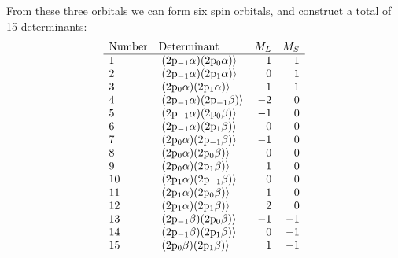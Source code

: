 \documentclass[../Main/chem532-notes.tex]{subfiles}
\begin{document}
\begin{example}
From these three orbitals we can form six spin orbitals, and construct a total of 15 determinants:
\begin{equation}
   \begin{array}{llrr}
    \text{Number} & \text{Determinant} & M_L & M_S \\
    \hline
   1 & \ket{(2\mathrm{p}_{-1} \alpha) (2\mathrm{p}_{0} \alpha)} & -1 & 1 \\
   2 & \ket{(2\mathrm{p}_{-1} \alpha) (2\mathrm{p}_{1} \alpha)} & 0 & 1 \\
   3 & \ket{(2\mathrm{p}_{0} \alpha) (2\mathrm{p}_{1} \alpha)} & 1 & 1 \\
   4 & \ket{(2\mathrm{p}_{-1} \alpha) (2\mathrm{p}_{-1} \beta)} & -2 & 0 \\
   5 & \ket{(2\mathrm{p}_{-1} \alpha) (2\mathrm{p}_{0} \beta)} & -1 & 0 \\
   6 & \ket{(2\mathrm{p}_{-1} \alpha) (2\mathrm{p}_{1} \beta)} & 0 & 0 \\
   7 & \ket{(2\mathrm{p}_{0} \alpha) (2\mathrm{p}_{-1} \beta)} & -1 & 0 \\
   8 & \ket{(2\mathrm{p}_{0} \alpha) (2\mathrm{p}_{0} \beta)} & 0 & 0 \\  
   9 & \ket{(2\mathrm{p}_{0} \alpha) (2\mathrm{p}_{1} \beta)} & 1 & 0 \\
   10 & \ket{(2\mathrm{p}_{1} \alpha) (2\mathrm{p}_{-1} \beta)} & 0 & 0 \\
   11 & \ket{(2\mathrm{p}_{1} \alpha) (2\mathrm{p}_{0} \beta)} & 1 & 0 \\
   12 & \ket{(2\mathrm{p}_{1} \alpha) (2\mathrm{p}_{1} \beta)} & 2 & 0 \\
   13 & \ket{(2\mathrm{p}_{-1} \beta) (2\mathrm{p}_{0} \beta)} & -1 & -1 \\
   14 & \ket{(2\mathrm{p}_{-1} \beta) (2\mathrm{p}_{1} \beta)} & 0 & -1 \\
   15 & \ket{(2\mathrm{p}_{0} \beta) (2\mathrm{p}_{1} \beta)} & 1 & -1 \\   
       \end{array}
\end{equation}


\end{example}
\end{document}

